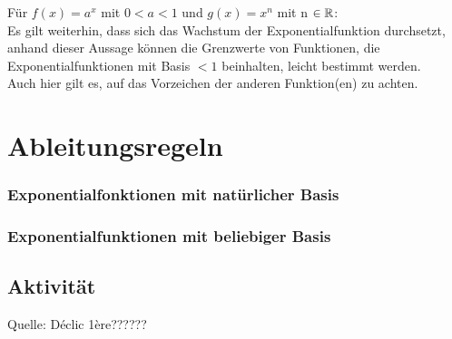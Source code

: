 Für $f(x)= a^x$ mit $0<a<1$ und $g(x)=x^n$ mit n $\in \mathbb{R}$:\\
Es gilt weiterhin, dass sich das Wachstum der Exponentialfunktion durchsetzt, anhand dieser Aussage können die Grenzwerte von Funktionen, die Exponentialfunktionen mit Basis $<1$ beinhalten, leicht bestimmt werden.\\
\danger Auch hier gilt es, auf das Vorzeichen der anderen Funktion(en) zu achten.

		


	


		\section{Ableitungsregeln}



\subsubsection{Exponentialfonktionen mit natürlicher Basis}

\subsubsection{Exponentialfunktionen mit beliebiger Basis}

	\subsection{Aktivität}

Quelle: Déclic 1ère??????